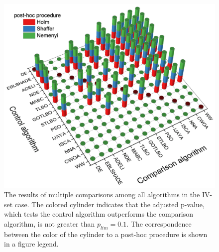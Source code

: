\documentclass[a4paper,fleqn]{cas-dc}
\begin{document}
\begin{figure}[]
	\centering
		\includegraphics[width=1.0\columnwidth]{NNresult}
	  \caption{The results of multiple comparisons among all algorithms in the IV-set case.
               The colored cylinder indicates that the adjusted p-value,
               which tests the control algorithm outperforms the comparison algorithm,
               is not greater than $p_{lim}=0.1$.
               The correspondence between the color of the cylinder to a post-hoc procedure is shown in a figure legend.
               }\label{figNNRezIVset}
\end{figure}



\end{document}
